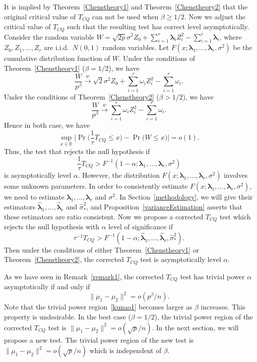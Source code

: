 \documentclass[3p]{elsarticle}
\newcommand{\bfsym}[1]{\ensuremath{\boldsymbol{#1}}}
\def\blambda {\bfsym {\lambda}}        \def\bLambda {\bfsym {\Lambda}}
\theoremstyle{plain}
\theoremstyle{definition}
\theoremstyle{remark}
\begin{document}
It is implied by Theorem~\ref{Chenstheory1} and Theorem~\ref{Chenstheory2} that the original critical value of $T_{CQ}$ can not be used when $\beta\geq 1/2$.
Now we adjust the critical value of $T_{CQ}$ such that the resulting test has correct level asymptotically.
Consider the random variable
$
W=
\sqrt{2p}\sigma^2 Z_0
+
        \sum_{i=1}^r \blambda_i Z_i^2
            -
        \sum_{i=1}^r \blambda_i
        $, 
where $Z_0,Z_1,\ldots,Z_r$ are i.i.d.\ $N(0,1)$ random variables.
Let $F(x;\blambda_1,\ldots,\blambda_r,\sigma^2)$ be the cumulative distribution function of $W$.
Under the conditions of Theorem~\ref{Chenstheory1} ($\beta=1/2$), we have
$$
\frac{W}{p^{\beta}}\xrightarrow{w}
\sqrt{2}\sigma^2 Z_0 + \sum_{i=1}^r \omega_i Z_i^2 -\sum_{i=1}^r \omega_i.
$$
Under the conditions of Theorem~\ref{Chenstheory2} ($\beta>1/2$), we have
$$
\frac{W}{p^{\beta}}\xrightarrow{w}
\sum_{i=1}^r \omega_i Z_i^2 -\sum_{i=1}^r \omega_i.
$$
Hence in both case, we have
$$
\sup_{x\in\mathbb{R}}\big|\Pr\big(\frac{1}{\tau}T_{CQ}\leq x\big)-\Pr\big(W\leq x\big)\big|
=o(1).
$$
Thus, the test that rejects the null hypothesis if
$$
\frac{1}{\tau}T_{CQ}>
F^{-1}(1-\alpha;\blambda_1,\ldots,\blambda_r,\sigma^2)
$$
is asymptotically level $\alpha$.
        However, the distribution $F(x;\blambda_1,\ldots,\blambda_r,\sigma^2)$ involves some unknown parameters.
In order to consistently estimate $F(x;\blambda_1,\ldots,\blambda_r,\sigma^2)$, we need to estimate $\blambda_1,\ldots,\blambda_r$ and $\sigma^2$.
In Section~\ref{methodology}, we will give their estimators $\hat{\blambda}_1,\ldots,\hat{\blambda}_r$ and $\hat{\sigma}_{*}^2$, and Proposition~\ref{varianceEstimation} asserts that these estimators are ratio consistent. 
Now we propose a corrected $T_{CQ}$ test which rejects the null hypothesis with $\alpha$ level of significance if
$$
\tau^{-1}{T_{CQ}}> F^{-1}(1-\alpha;\hat{\blambda}_1,\ldots,\hat{\blambda}_r,\hat{\sigma}_*^2).
$$
Then under the conditions of either Theorem~\ref{Chenstheory1} or Theorem~\ref{Chenstheory2}, the corrected $T_{CQ}$ test is asymptotically level $\alpha$.


As we have seen in Remark~\ref{remark1}, the corrected $T_{CQ}$ test has trivial power $\alpha$ asymptotically if and only if
\begin{equation}\label{kunao1}
\|\mu_1-\mu_2\|^2 = o( p^{\beta}/n).
\end{equation}
Note that the trivial power region~\eqref{kunao1} becomes larger as $\beta$ increases.
This property is undesirable.
In the best case ($\beta=1/2$), the trivial power region of the corrected $T_{CQ}$ test is $\|\mu_1-\mu_2\|^2=o(\sqrt{p}/n)$.
In the next section, we will propose a new test. The trivial power region of the new test is $\|\mu_1-\mu_2\|^2=o(\sqrt{p}/n)$ which is independent of $\beta$.
\end{document}
